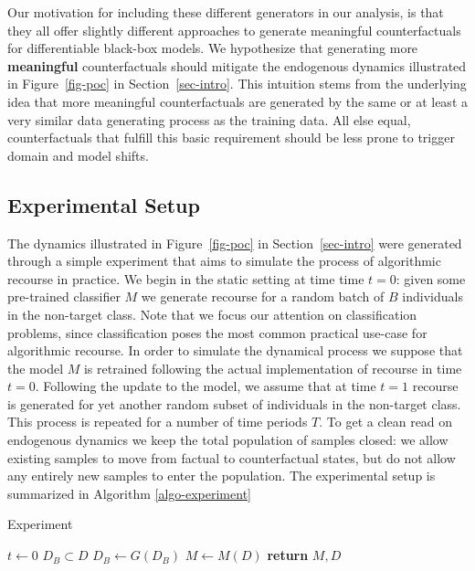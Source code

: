 \documentclass[
  conference]{IEEEtran}
\begin{document}
Our motivation for including these different generators in our analysis,
is that they all offer slightly different approaches to generate
meaningful counterfactuals for differentiable black-box models. We
hypothesize that generating more \textbf{meaningful} counterfactuals
should mitigate the endogenous dynamics illustrated in
Figure~\ref{fig-poc} in Section~\ref{sec-intro}. This intuition stems
from the underlying idea that more meaningful counterfactuals are
generated by the same or at least a very similar data generating process
as the training data. All else equal, counterfactuals that fulfill this
basic requirement should be less prone to trigger domain and model
shifts.

\hypertarget{sec-method-experiment}{%
\subsection{Experimental Setup}\label{sec-method-experiment}}

The dynamics illustrated in Figure~\ref{fig-poc} in
Section~\ref{sec-intro} were generated through a simple experiment that
aims to simulate the process of algorithmic recourse in practice. We
begin in the static setting at time time \(t=0\): given some pre-trained
classifier \(M\) we generate recourse for a random batch of \(B\)
individuals in the non-target class. Note that we focus our attention on
classification problems, since classification poses the most common
practical use-case for algorithmic recourse. In order to simulate the
dynamical process we suppose that the model \(M\) is retrained following
the actual implementation of recourse in time \(t=0\). Following the
update to the model, we assume that at time \(t=1\) recourse is
generated for yet another random subset of individuals in the non-target
class. This process is repeated for a number of time periods \(T\). To
get a clean read on endogenous dynamics we keep the total population of
samples closed: we allow existing samples to move from factual to
counterfactual states, but do not allow any entirely new samples to
enter the population. The experimental setup is summarized in Algorithm
\ref{algo-experiment}

\begin{algorithm}
\caption{Experiment}\label{algo-experiment}
\begin{algorithmic}[1]
\State $t\gets 0$
\State $D_B \subset D$
\State $D_B\gets G(D_B)$ 
\State $M\gets M(D)$ 
\EndWhile
\State \textbf{return} $M,D$
\EndProcedure
\end{algorithmic}
\end{algorithm}
\end{document}
